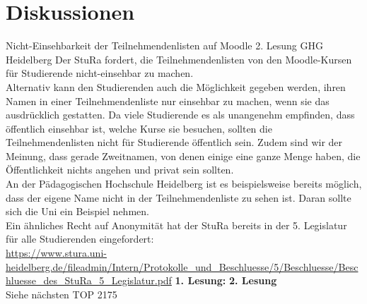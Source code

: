 \section{Diskussionen}

\antrag
{
    Nicht-Einsehbarkeit der Teilnehmendenlisten auf Moodle
}{
    2. Lesung
}{
    GHG Heidelberg
}{
    Der StuRa fordert, die Teilnehmendenlisten von den Moodle-Kursen für Studierende nicht-einsehbar zu
    machen.\\
    Alternativ kann den Studierenden auch die Möglichkeit gegeben werden, ihren Namen in einer
    Teilnehmendenliste nur einsehbar zu machen, wenn sie das ausdrücklich gestatten.
}{
    Da viele Studierende es als unangenehm empfinden, dass öffentlich einsehbar ist, welche Kurse sie
    besuchen, sollten die Teilnehmendenlisten nicht für Studierende öffentlich sein. Zudem sind wir der
    Meinung, dass gerade Zweitnamen, von denen einige eine ganze Menge haben, die Öffentlichkeit nichts
    angehen und privat sein sollten.\\
    An der Pädagogischen Hochschule Heidelberg ist es beispielsweise bereits möglich, dass der eigene
    Name nicht in der Teilnehmendenliste zu sehen ist. Daran sollte sich die Uni ein Beispiel nehmen.\\
    Ein ähnliches Recht auf Anonymität hat der StuRa bereits in der 5. Legislatur für alle Studierenden
    eingefordert:\\
    \url{https://www.stura.uni-heidelberg.de/fileadmin/Intern/Protokolle_und_Beschluesse/5/Beschluesse/Beschluesse_des_StuRa_5_Legislatur.pdf}
}{\textbf{1. Lesung:}
    \ul{
            \ul{}
            \ul{}
            \ul{}
            \ul{}
            \ul{}
    }
    \textbf{2. Lesung}\\
    Siehe nächsten TOP
}{21}{7}{5}

